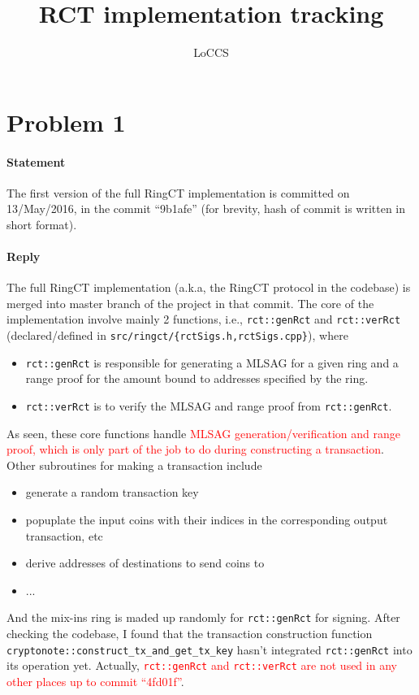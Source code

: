 \documentclass[a4paper,10pt]{article}
\begin{document}
\title{RCT implementation tracking}
\author{LoCCS}
\maketitle

\section{Problem 1}
\paragraph{Statement} The first version of the full RingCT implementation is committed on 13/May/2016, in the commit ``9b1afe'' (for brevity, hash of commit is written in short format).
\paragraph{Reply} The full RingCT implementation (a.k.a, the RingCT protocol in the codebase) is merged into master branch of the project in that commit. The core of the implementation involve mainly 2 functions, i.e., \texttt{rct::genRct} and \texttt{rct::verRct} (declared/defined in \texttt{src/ringct/\{rctSigs.h,rctSigs.cpp\}}), where 
	\begin{itemize}
		\item \texttt{rct::genRct} is responsible for generating a MLSAG for a given ring and a range proof for the amount bound to addresses specified by the ring. 
		\item \texttt{rct::verRct} is to verify the MLSAG and range proof from \texttt{rct::genRct}.
	\end{itemize}
	As seen, these core functions handle \textcolor{red}{MLSAG generation/verification and range proof, which is only part of the job to do during constructing a transaction}. Other subroutines for making a transaction include
	\begin{itemize}
		\item generate a random transaction key
		\item popuplate the input coins with their indices in the corresponding output transaction, etc
		\item derive addresses of destinations to send coins to
		\item ...
	\end{itemize}
	And the mix-ins ring is maded up randomly for \texttt{rct::genRct} for signing. After checking the codebase, I found that the transaction construction function \texttt{cryptonote::construct\_tx\_and\_get\_tx\_key} hasn't integrated \texttt{rct::genRct} into its operation yet. Actually, \textcolor{red}{\texttt{rct::genRct} and \texttt{rct::verRct} are not used in any other places up to commit ``4fd01f''}.
\end{document}
